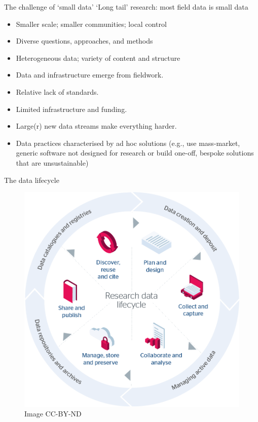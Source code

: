 \begin{frame}{The challenge of `small data'}
    `Long tail' research: most field data is small data \parencite{Borgman2015-rh}
    \begin{itemize}
        \item Smaller scale; smaller communities; local control
        \item Diverse questions, approaches, and methods
        \item Heterogeneous data; variety of content and structure
        \item Data and infrastructure emerge from fieldwork. 
        \item Relative lack of standards.
        \item Limited infrastructure and funding.
        \item Large(r) new data streams make everything harder.
        \item Data practices characterised by ad hoc solutions (e.g., use mass-market, generic software not designed for research or build one-off, bespoke solutions that are unsustainable)
    \end{itemize}
\end{frame}



\begin{frame}{The data lifecycle}
 \begin{figure}[H]
    \centering
    \vspace{-0.5cm}
        \includegraphics[height=.75\textheight]{figures/research-data-life-diagram.png}
        \caption{\cite{Jisc2018-gx} Image CC-BY-ND}
        \label{fig:figure9}
 \end{figure}
\end{frame}

